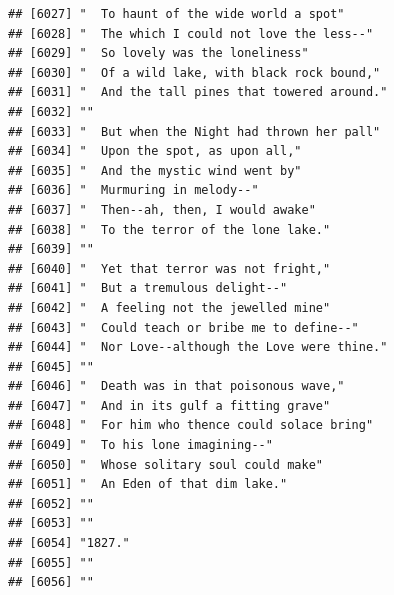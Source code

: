 \documentclass{article}\usepackage[]{graphicx}\usepackage[]{color}
\makeatletter
\newenvironment{kframe}{%
 \def\at@end@of@kframe{}%
 \ifinner\ifhmode%
  \def\at@end@of@kframe{\end{minipage}}%
  \begin{minipage}{\columnwidth}%
 \fi\fi%
 \def\FrameCommand##1{\hskip\@totalleftmargin \hskip-\fboxsep
 \colorbox{shadecolor}{##1}\hskip-\fboxsep
     \hskip-\linewidth \hskip-\@totalleftmargin \hskip\columnwidth}%
 \MakeFramed {\advance\hsize-\width
   \@totalleftmargin\z@ \linewidth\hsize
   \@setminipage}}%
 {\par\unskip\endMakeFramed%
 \at@end@of@kframe}
\newenvironment{knitrout}{}{} %
\makeatother
\begin{document}
\begin{knitrout}
\begin{kframe}
\begin{verbatim}
## [6027] "  To haunt of the wide world a spot"                                         
## [6028] "  The which I could not love the less--"                                     
## [6029] "  So lovely was the loneliness"                                              
## [6030] "  Of a wild lake, with black rock bound,"                                    
## [6031] "  And the tall pines that towered around."                                   
## [6032] ""                                                                            
## [6033] "  But when the Night had thrown her pall"                                    
## [6034] "  Upon the spot, as upon all,"                                               
## [6035] "  And the mystic wind went by"                                               
## [6036] "  Murmuring in melody--"                                                     
## [6037] "  Then--ah, then, I would awake"                                             
## [6038] "  To the terror of the lone lake."                                           
## [6039] ""                                                                            
## [6040] "  Yet that terror was not fright,"                                           
## [6041] "  But a tremulous delight--"                                                 
## [6042] "  A feeling not the jewelled mine"                                           
## [6043] "  Could teach or bribe me to define--"                                       
## [6044] "  Nor Love--although the Love were thine."                                   
## [6045] ""                                                                            
## [6046] "  Death was in that poisonous wave,"                                         
## [6047] "  And in its gulf a fitting grave"                                           
## [6048] "  For him who thence could solace bring"                                     
## [6049] "  To his lone imagining--"                                                   
## [6050] "  Whose solitary soul could make"                                            
## [6051] "  An Eden of that dim lake."                                                 
## [6052] ""                                                                            
## [6053] ""                                                                            
## [6054] "1827."                                                                       
## [6055] ""                                                                            
## [6056] ""                                                                            

\end{verbatim}
\end{kframe}
\end{knitrout}
\end{document}
